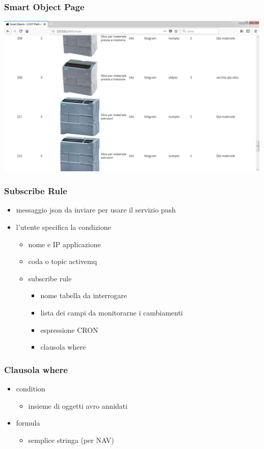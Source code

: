 \documentclass{beamer}
\begin{document}
\begin{frame}
\frametitle{Smart Object Page}
\includegraphics[width=1\textwidth]{images/SmartObjectsPlatform.png}
\end{frame}

\begin{frame}
\frametitle{Subscribe Rule}
\begin{itemize}
	\item messaggio json da inviare per usare il servizio push
	\item l'utente specifica la condizione
	\begin{itemize}
		\item nome e IP applicazione
		\item coda o topic activemq
		\item subscribe rule
		\begin{itemize}
			\item nome tabella da interrogare
			\item lista dei campi da monitorarne i cambiamenti
			\item espressione CRON
			\item clausola where
			
		\end{itemize}
	\end{itemize}
\end{itemize}
\end{frame}

\begin{frame}
\frametitle{Clausola where}
\begin{itemize}
	\item condition
	\begin{itemize}
		\item insieme di oggetti avro annidati
	\end{itemize}
	\item formula
	\begin{itemize}
		\item semplice stringa (per NAV)
	\end{itemize}
\end{itemize}
\end{frame}
\end{document}
